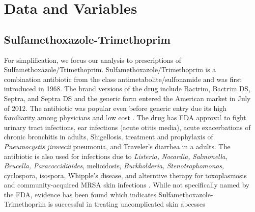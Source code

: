 \chapter{Data and Variables}

\section{Sulfamethoxazole-Trimethoprim}
\indent For simplification, we focus our analysis to prescriptions of Sulfamethoxazole/Trimethoprim. Sulfamethoxazole/Trimethoprim is a combination antibiotic from the class antimetabolite/sulfonamide and was first introduced in 1968. The brand versions of the drug include Bactrim, Bactrim DS, Septra, and Septra DS and the generic form entered the American market in July of 2012. The antibiotic was popular even before generic entry due its high familiarity among physicians and low cost \cite{noauthor_sulfamethoxazole_nodate,ho_considerations_2011}. The drug has FDA approval to fight urinary tract infections, ear infections (acute otitis media), acute exacerbations of chronic bronchitis in adults, Shigellosis, treatment and prophylaxis of \textit{Pneumocystis jirovecii} pneumonia, and Traveler's diarrhea in a adults. The antibiotic is also used for infections due to \textit{Listeria, Nocardia, Salmonella, Brucella, Paracoccidioides,} melioidosis, \textit{Burkholderia, Stenotrophomonas,} cyclospora, isospora, Whipple's disease, and alterntive therapy for toxoplasmosis and community-acquired MRSA skin infections \cite{schlossberg_antibiotics_2017}. While not specifically named by the FDA, evidence has been found which indicates Sulfamethoxazole-Trimethoprim is successful in treating uncomplicated skin abcesses \cite{noauthor_trimethoprimsulfamethoxazole_nodate}\\

